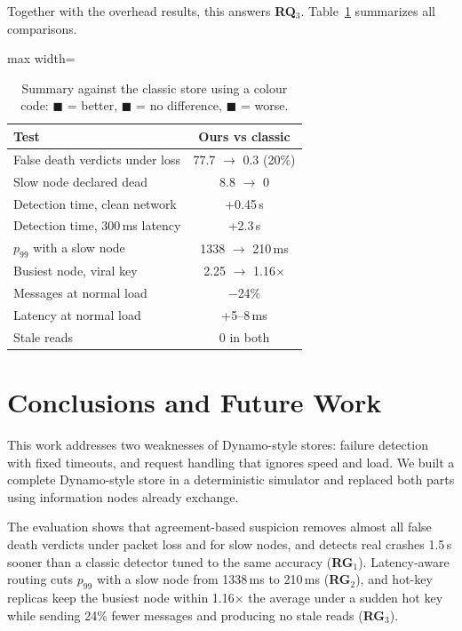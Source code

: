 \documentclass[sigconf,nonacm]{acmart}
\newcommand{\win}[1]{\textcolor{win}{#1}}
\newcommand{\tie}[1]{\textcolor{tie}{#1}}
\newcommand{\loss}[1]{\textcolor{loss}{#1}}
\begin{document}
Together with the overhead results, this answers \textbf{RQ}$_3$. Table~\ref{tab:summary} summarizes all comparisons.

\begin{table}[h]
\caption{Summary against the classic store using a colour code: \win{$\blacksquare$} = better, \tie{$\blacksquare$} = no difference, \loss{$\blacksquare$} = worse.}
\label{tab:summary}
\small
\begin{adjustbox}{max width=\columnwidth}
\begin{tabular}{lc}
\toprule
\textbf{Test} & \textbf{Ours vs classic} \\
\midrule
False death verdicts under loss & \win{77.7 $\rightarrow$ 0.3 (20\%)} \\
Slow node declared dead & \win{8.8 $\rightarrow$ 0} \\
Detection time, clean network & \loss{+0.45\,s} \\
Detection time, 300\,ms latency & \loss{+2.3\,s} \\
$p_{99}$ with a slow node & \win{1338 $\rightarrow$ 210\,ms} \\
Busiest node, viral key & \win{2.25 $\rightarrow$ 1.16$\times$} \\
Messages at normal load & \win{$-$24\%} \\
Latency at normal load & \loss{+5--8\,ms} \\
Stale reads & \tie{0 in both} \\
\bottomrule
\end{tabular}
\end{adjustbox}
\end{table}

\section{Conclusions and Future Work}

This work addresses two weaknesses of Dynamo-style stores: failure detection with fixed timeouts, and request handling that ignores speed and load. We built a complete Dynamo-style store in a deterministic simulator and replaced both parts using information nodes already exchange.

The evaluation shows that agreement-based suspicion removes almost all false death verdicts under packet loss and for slow nodes, and detects real crashes 1.5\,s sooner than a classic detector tuned to the same accuracy (\textbf{RG}$_1$). Latency-aware routing cuts $p_{99}$ with a slow node from 1338\,ms to 210\,ms (\textbf{RG}$_2$), and hot-key replicas keep the busiest node within 1.16$\times$ the average under a sudden hot key while sending 24\% fewer messages and producing no stale reads (\textbf{RG}$_3$).
\end{document}
